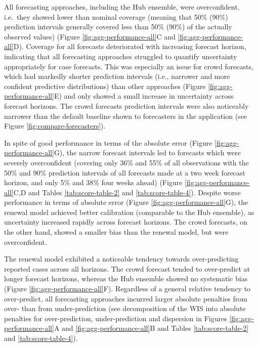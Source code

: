 \documentclass[10pt,letterpaper]{article}
\begin{document}
All forecasting approaches, including the Hub ensemble, were
overconfident, i.e.~they showed lower than nominal coverage (meaning
that 50\% (90\%) prediction intervals generally covered less than 50\%
(90\%) of the actually observed values) (Figure
\ref{fig:agg-performance-all}C and \ref{fig:agg-performance-all}D).
Coverage for all forecasts deteriorated with increasing forecast
horizon, indicating that all forecasting approaches struggled to
quantify uncertainty appropriately for case forecasts. This was
especially an issue for crowd forecasts, which had markedly shorter
prediction intervals (i.e., narrower and more confident predictive
distributions) than other approaches (Figure
\ref{fig:agg-performance-all}E) and only showed a small increase in
uncertainty across forecast horizons. The crowd forecasts prediction
intervals were also noticeably narrower than the default baseline shown
to forecasters in the application (see Figure
\ref{fig:compare-forecasters}).

In spite of good performance in terms of the absolute error (Figure
\ref{fig:agg-performance-all}G), the narrow forecast intervals led to
forecasts which were severely overconfident (covering only 36\% and 55\%
of all observations with the 50\% and 90\% prediction intervals of all
forecasts made at a two week forecast horizon, and only 5\% and 38\%
four weeks ahead) (Figure \ref{fig:agg-performance-all}C,D and Tables
\ref{tab:score-table-2} and \ref{tab:score-table-4}). Despite worse
performance in terms of absolute error (Figure
\ref{fig:agg-performance-all}G), the renewal model achieved better
calibration (comparable to the Hub ensemble), as uncertainty increased
rapidly across forecast horizons. The crowd forecasts, on the other
hand, showed a smaller bias than the renewal model, but were
overconfident.

The renewal model exhibited a noticeable tendency towards
over-predicting reported cases across all horizons. The crowd forecast
tended to over-predict at longer forecast horizons, whereas the Hub
ensemble showed no systematic bias (Figure
\ref{fig:agg-performance-all}F). Regardless of a general relative
tendency to over-predict, all forecasting approaches incurred larger
absolute penalties from over- than from under-prediction (see
decomposition of the WIS into absolute penalties for over-prediction,
under-prediction and dispersion in Figures
\ref{fig:agg-performance-all}A and \ref{fig:agg-performance-all}B and
Tables \ref{tab:score-table-2} and \ref{tab:score-table-4}).
\end{document}
